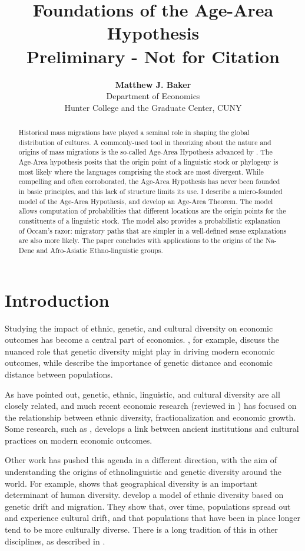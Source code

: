 \documentclass[11pt]{article}
\title{Foundations of the Age-Area Hypothesis \\ \large{Preliminary - Not for Citation}}
\author{\textbf{Matthew J. Baker} \\ Department of Economics \\ Hunter College and the Graduate Center, CUNY}
\begin{document}
\maketitle
\begin{abstract}
\noindent Historical mass migrations have played a seminal role in shaping the global distribution of cultures. A commonly-used tool in theorizing about the nature and origins of mass migrations is the so-called Age-Area Hypothesis advanced by \cite{sapir16}. The Age-Area hypothesis posits that the origin point of a linguistic stock or phylogeny is most likely where the languages comprising the stock are most divergent. While compelling and often corroborated, the Age-Area Hypothesis has never been founded in basic principles, and this lack of structure limits its use. I describe a micro-founded model of the Age-Area Hypothesis, and develop an Age-Area Theorem. The model allows computation of probabilities that different locations are the origin points for the constituents of a linguistic stock. The model also provides a probabilistic explanation of Occam's razor: migratory paths that are simpler in a well-defined sense explanations are also more likely. The paper concludes with applications to the origins of the Na-Dene and Afro-Asiatic Ethno-linguistic groups. 
\end{abstract}
\newpage

\section{Introduction}
Studying the impact of ethnic, genetic, and cultural diversity on economic outcomes has become a central part of economics. \cite{ashraf13}, for example, discuss the nuanced role that genetic diversity might play in driving modern economic outcomes, while \cite{spolaore09} describe the importance of genetic distance and economic distance between populations. 

As \cite{cavalli95} have pointed out, genetic, ethnic, linguistic, and cultural diversity are all closely related, and much recent economic research (reviewed in \cite{alesina05}) has focused on the relationship between ethnic diversity, fractionalization and economic growth. Some research, such as \cite{spolaore13}, develops a link between ancient institutions and cultural practices on modern economic outcomes. 

Other work has pushed this agenda in a different direction, with the aim of understanding the origins of ethnolinguistic and genetic diversity around the world.  For example, \cite{michalopoulos12} shows that geographical diversity is an important determinant of human diversity.  \cite{ahlerup12} develop a model of ethnic diversity based on genetic drift and migration. They show that, over time, populations spread out and experience cultural drift, and that populations that have been in place longer tend to be more culturally diverse. There is a long tradition of this in other disciplines, as described in \cite{mace05}. 
\end{document}
